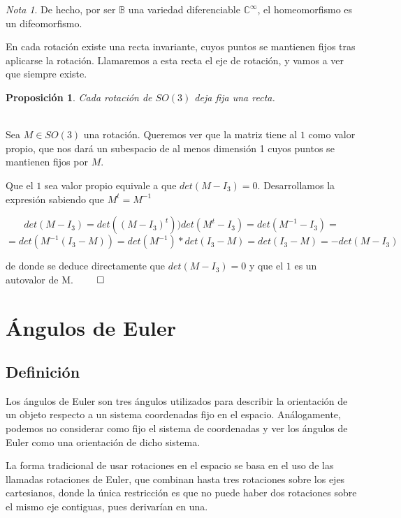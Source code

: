 \documentclass{article}
\theoremstyle{plain}
\newtheorem{proposition}{Proposición}
\theoremstyle{definition}
\theoremstyle{remark}
\newtheorem*{remark}{Nota}
\begin{document}
\begin{remark}
	De hecho, por ser $\mathbb B$ una variedad diferenciable $\mathbb{C^{\infty}}$, el homeomorfismo es un difeomorfismo.
\end{remark}

En cada rotación existe una recta invariante, cuyos puntos se mantienen fijos tras aplicarse la rotación.
Llamaremos a esta recta el eje de rotación, y vamos a ver que siempre existe.


\begin{proposition}
	Cada rotación de $SO(3)$ deja fija una recta.
\end{proposition}

\begin{proofname}\\
	Sea $ M \in SO(3)$ una rotación. Queremos ver que la matriz tiene al $1$ como valor propio, que nos dará un subespacio
	de al menos dimensión 1 cuyos puntos se mantienen fijos por $M$.

	Que el $1$ sea valor propio equivale a que $ det(M - I_3) = 0$. Desarrollamos la expresión sabiendo que $M^t = M^{-1}$

	\[ det(M - I_3) = det((M - I_3)^t) ) det(M^t - I_3) = det(M^{-1} - I_3) = \]
	\[= det(M^{-1}(I_3 - M)) = det(M^{-1}) * det(I_3 - M) = det(I_3 - M) = -det(M - I_3) \]

	de donde se deduce directamente que $det(M - I_3) = 0$ y que el $1$ es un autovalor de M. $\qed$
\end{proofname}


\section{Ángulos de Euler}
\subsection{Definición}

Los ángulos de Euler son tres ángulos utilizados para describir la orientación de un objeto respecto a un sistema
coordenadas fijo en el espacio. Análogamente, podemos no considerar como fijo el sistema de coordenadas y ver
los ángulos de Euler como una orientación de dicho sistema.

La forma tradicional de usar rotaciones en el espacio se basa en el uso de las llamadas rotaciones de Euler,
que combinan hasta tres rotaciones sobre los ejes cartesianos, donde la única restricción es que no puede
haber dos rotaciones sobre el mismo eje contiguas, pues derivarían en una.
\end{document}
